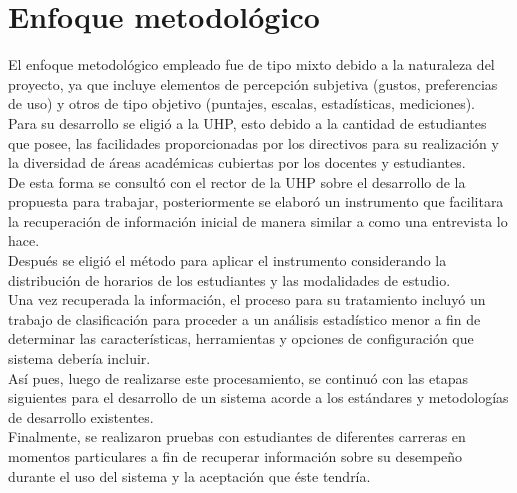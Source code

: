 \documentclass[12pt]{article} %
\begin{document}
\section{Enfoque metodológico}
El enfoque metodológico empleado fue de tipo mixto debido a la naturaleza del proyecto, ya que incluye elementos de percepción subjetiva (gustos, preferencias de uso) y otros de tipo objetivo (puntajes, escalas, estadísticas, mediciones).\\
Para su desarrollo se eligió a la UHP, esto debido a la cantidad de estudiantes que posee, las facilidades proporcionadas por los directivos para su realización y la diversidad de áreas académicas cubiertas por los docentes y estudiantes.\\
De esta forma se consultó con el rector de la UHP sobre el desarrollo de la propuesta para trabajar, posteriormente se elaboró un instrumento que facilitara la recuperación de información inicial de manera similar a como una entrevista lo hace.\\
Después se eligió el método para aplicar el instrumento considerando la distribución de horarios de los estudiantes y las modalidades de estudio.\\
Una vez recuperada la información, el proceso para su tratamiento incluyó un trabajo de clasificación para proceder a un análisis estadístico menor a fin de determinar las características, herramientas y opciones de configuración que sistema debería incluir.\\
Así pues, luego de realizarse este procesamiento, se continuó con las etapas siguientes para el desarrollo de un sistema acorde a los estándares y metodologías de desarrollo existentes.\\
Finalmente, se realizaron pruebas con estudiantes de diferentes carreras en momentos particulares a fin de recuperar información sobre su desempeño durante el uso del sistema y la aceptación que éste tendría.
\end{document}
